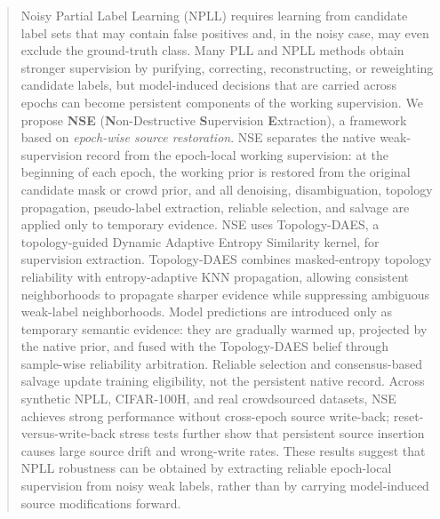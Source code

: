 \begin{abstract}
Noisy Partial Label Learning (NPLL) requires learning from candidate label sets that may contain false positives and, in the noisy case, may even exclude the ground-truth class. Many PLL and NPLL methods obtain stronger supervision by purifying, correcting, reconstructing, or reweighting candidate labels, but model-induced decisions that are carried across epochs can become persistent components of the working supervision. We propose \textbf{NSE} (\textbf{N}on-Destructive \textbf{S}upervision \textbf{E}xtraction), a framework based on \emph{epoch-wise source restoration}. NSE separates the native weak-supervision record from the epoch-local working supervision: at the beginning of each epoch, the working prior is restored from the original candidate mask or crowd prior, and all denoising, disambiguation, topology propagation, pseudo-label extraction, reliable selection, and salvage are applied only to temporary evidence. NSE uses Topology-DAES, a topology-guided Dynamic Adaptive Entropy Similarity kernel, for supervision extraction. Topology-DAES combines masked-entropy topology reliability with entropy-adaptive KNN propagation, allowing consistent neighborhoods to propagate sharper evidence while suppressing ambiguous weak-label neighborhoods. Model predictions are introduced only as temporary semantic evidence: they are gradually warmed up, projected by the native prior, and fused with the Topology-DAES belief through sample-wise reliability arbitration. Reliable selection and consensus-based salvage update training eligibility, not the persistent native record. Across synthetic NPLL, CIFAR-100H, and real crowdsourced datasets, NSE achieves strong performance without cross-epoch source write-back; reset-versus-write-back stress tests further show that persistent source insertion causes large source drift and wrong-write rates. These results suggest that NPLL robustness can be obtained by extracting reliable epoch-local supervision from noisy weak labels, rather than by carrying model-induced source modifications forward.
\end{abstract}

